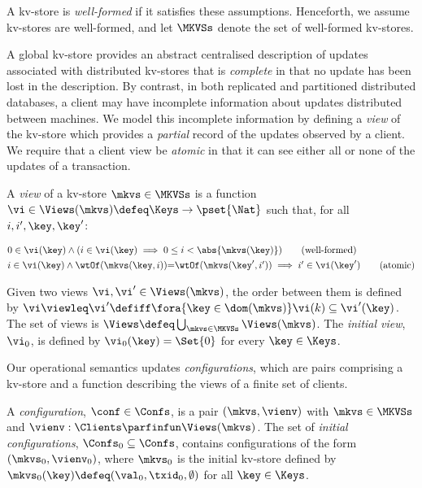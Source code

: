 \noindent A kv-store is
\emph{well-formed} if it satisfies these assumptions.
Henceforth, we assume kv-stores are well-formed,
and let \(\MKVSs\) denote the set of well-formed kv-stores.

A global kv-store provides an abstract centralised description of
updates associated with distributed kv-stores that is \emph{complete} in 
that no update has been lost in the description. By contrast, in
both replicated and partitioned distributed databases, a client may
have incomplete information about updates distributed between
machines.  We model this incomplete information by
defining a {\em view} of the kv-store which provides a {\em
  partial} record of the updates observed by a client. We require that a client view be {\em atomic} in that it can
see either all or none of the updates of a transaction.

\SpaceAboveDef
\begin{definition}[Views]
\label{def:view}
\label{def:cuts}
\label{def:views}
A \emph{view} of a kv-store \(\mkvs \in \MKVSs\) is a function
\(\vi \in \Views(\mkvs) \defeq \Keys \to\pset{\Nat}\) such that, for all \(i, i', \key, \key'\):

\SpaceAboveMath
\begin{align*}
    & 
    0 \in \vi(\key) 
    \land (i \in \vi(\key) \implies 0 \leq i < \abs{ \mkvs(\key) }) 
    \tag{well-formed}
    \label{eq:view.wf}\\
    & 
    \begin{array}{@{}l@{}}
	i \in \vi(\key)  
  	\land \wtOf(\mkvs(\key, i)) {=} \wtOf(\mkvs(\key', i'))  
  	\implies i' \in \vi(\key')
    \end{array}
	\tag{atomic}
	\label{eq:view.atomic}
\end{align*}
\SpaceBelowMath

Given two views \(\vi, \vi' \in \Views(\mkvs)\), 
the order between them is defined by \(\vi \viewleq \vi' \defiff \fora{\key \in \dom(\mkvs)} \vi(k) \subseteq \vi'(\key)\).
The set of views is \(\Views \defeq \bigcup_{\mkvs \in \MKVSs} \Views(\mkvs)\).
The \emph{initial view}, \(\vi_{0}\),  is defined by
\(\vi_{0}(\key) = \Set{0}\) for every \(\key \in \Keys\). 
\end{definition}
\SpaceBelowDef

Our operational semantics updates {\em configurations},  which are pairs
comprising a kv-store and a function describing the
views of a finite set of clients. 

\SpaceAboveDef
\begin{definition}[Configurations]
\label{def:configuration}
A \emph{configuration}, \(\conf \in \Confs \),  is a pair \( (\mkvs, \vienv)\)
with \(\mkvs \in \MKVSs\) and
\(\vienv : \Clients \parfinfun \Views(\mkvs)\). 
The set of \emph{initial configurations}, \(\Confs_0 \subseteq \Confs\),
contains configurations of the form \( (\mkvs_0, \vienv_0)\), where
\(\mkvs_0\) is the initial kv-store defined by
\(\mkvs_{0}(\key)\defeq  (\val_0, \txid_0, \emptyset)\) for
all \(\key \in \Keys\). 
\end{definition}
\SpaceBelowDef


